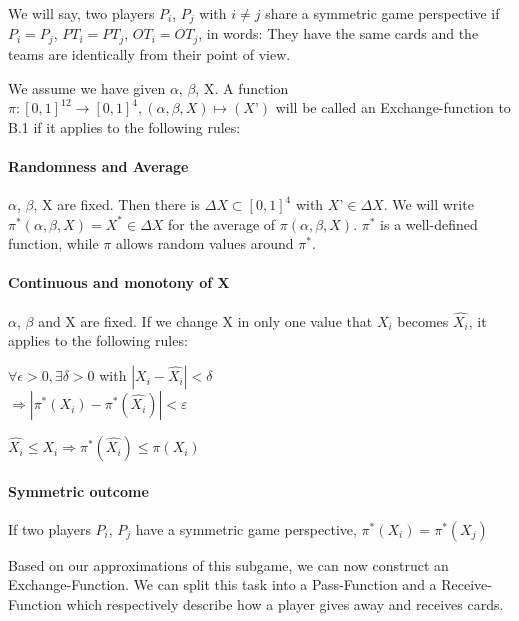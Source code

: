 \begin{definition}
We will say, two players $P_i$, $P_j$ with  $i \neq j$ share a symmetric game perspective if $P_i = P_j$, $PT_i = PT_j$, $OT_i = OT_j$, in words: They have the same cards and the teams are identically from their point of view. 
\end{definition}
\begin{definition}
We assume we have given $\alpha$, $\beta$, X. A function $\pi: [0,1]^{12} \to [0,1]^4, (\alpha, \beta, X) \mapsto (X’)$ will be called an Exchange-function to B.1  if it applies to the following rules:
\paragraph{Randomness and Average}
$\alpha$, $\beta$, X are fixed. Then there is $\Delta X \subset [0,1]^4$ with $X’ \in \Delta X$. We will write $\pi^* (\alpha, \beta, X) = X^* \in \Delta X$ for the average of $\pi(\alpha, \beta, X)$. $\pi^*$ is a well-defined function, while $\pi$ allows random values around $\pi^*$.
\paragraph{Continuous and monotony of X}
$\alpha$, $\beta$ and X are fixed. If we change X in only one value that $X_i$ becomes $\widehat{X_i}$, it applies to the following rules:
\begin{axioms}[(C1)]
\item $\forall \epsilon > 0, \exists \delta > 0$ with $| X_i - \widehat{X_i}| < \delta$ \\$\Rightarrow | \pi^*(X_i) - \pi^*(\widehat{X_i}) | < \varepsilon $
\item $\widehat{X_i} \leq X_i \Rightarrow \pi^*(\widehat{X_i}) \leq \pi(X_i)$
\end{axioms}

\paragraph{Symmetric outcome}
If two players $P_i$, $P_j$ have a symmetric game perspective, $\pi^*(X_i) = \pi^*(X_j)$
\end{definition}

Based on our approximations of this subgame, we can now construct an Exchange-Function. We can split this task into a Pass-Function and a Receive-Function which respectively describe how a player gives away and receives cards.

